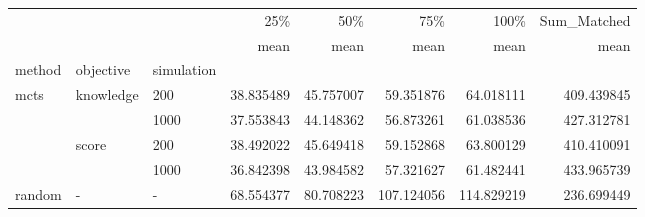 \begin{tabular}{lllrrrrr}
\toprule
       &   &   &        25\% &        50\% &         75\% &        100\% & Sum\_Matched \\
       &   &   &       mean &       mean &        mean &        mean &        mean \\
method & objective & simulation &            &            &             &             &             \\
\midrule
mcts & knowledge & 200 &  38.835489 &  45.757007 &   59.351876 &   64.018111 &  409.439845 \\
       &   & 1000 &  37.553843 &  44.148362 &   56.873261 &   61.038536 &  427.312781 \\
       & score & 200 &  38.492022 &  45.649418 &   59.152868 &   63.800129 &  410.410091 \\
       &   & 1000 &  36.842398 &  43.984582 &   57.321627 &   61.482441 &  433.965739 \\
random & - & - &  68.554377 &  80.708223 &  107.124056 &  114.829219 &  236.699449 \\
\bottomrule
\end{tabular}
